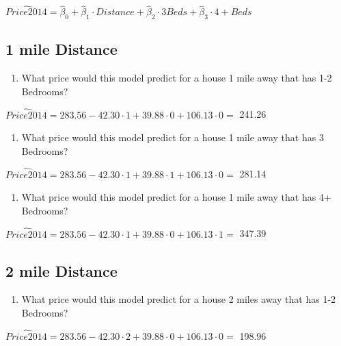 \documentclass[]{article}
\providecommand{\tightlist}{%
  \setlength{\itemsep}{0pt}\setlength{\parskip}{0pt}}
\begin{document}
\(\widehat{Price2014} = \hat{\beta}_0 + \hat{\beta}_1 \cdot Distance + \hat{\beta}_2 \cdot 3 Beds + \hat{\beta}_3 \cdot {4+} Beds\)

\hypertarget{mile-distance}{%
\subsection{1 mile Distance}\label{mile-distance}}

\begin{enumerate}
\def\labelenumi{\arabic{enumi}.}
\setcounter{enumi}{4}
\tightlist
\item
  What price would this model predict for a house 1 mile away that has
  1-2 Bedrooms?
\end{enumerate}

\(\widehat{Price2014} = 283.56 - 42.30 \cdot 1 + 39.88 \cdot 0 + 106.13 \cdot 0=\)
241.26

\begin{enumerate}
\def\labelenumi{\arabic{enumi}.}
\setcounter{enumi}{5}
\tightlist
\item
  What price would this model predict for a house 1 mile away that has 3
  Bedrooms?
\end{enumerate}

\(\widehat{Price2014} = 283.56 - 42.30 \cdot 1 + 39.88 \cdot 1 + 106.13 \cdot 0=\)
281.14

\begin{enumerate}
\def\labelenumi{\arabic{enumi}.}
\setcounter{enumi}{6}
\tightlist
\item
  What price would this model predict for a house 1 mile away that has
  4+ Bedrooms?
\end{enumerate}

\(\widehat{Price2014} = 283.56 - 42.30 \cdot 1 + 39.88 \cdot 0 + 106.13 \cdot 1=\)
347.39

\hypertarget{mile-distance-1}{%
\subsection{2 mile Distance}\label{mile-distance-1}}

\begin{enumerate}
\def\labelenumi{\arabic{enumi}.}
\setcounter{enumi}{7}
\tightlist
\item
  What price would this model predict for a house 2 miles away that has
  1-2 Bedrooms?
\end{enumerate}

\(\widehat{Price2014} = 283.56 - 42.30 \cdot 2 + 39.88 \cdot 0 + 106.13 \cdot 0=\)
198.96
\end{document}
